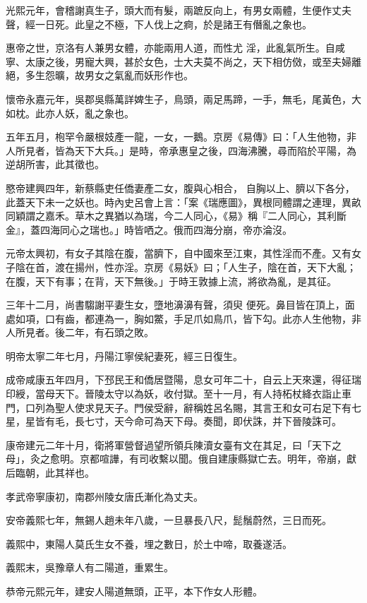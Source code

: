\begin{pinyinscope}
 光熙元年，會稽謝真生子，頭大而有髮，兩蹠反向上，有男女兩體，生便作丈夫聲，經一日死。此皇之不極，下人伐上之痾，於是諸王有僭亂之象也。



 惠帝之世，京洛有人兼男女體，亦能兩用人道，而性尤
 淫，此亂氣所生。自咸寧、太康之後，男寵大興，甚於女色，士大夫莫不尚之，天下相仿傚，或至夫婦離絕，多生怨曠，故男女之氣亂而妖形作也。



 懷帝永嘉元年，吳郡吳縣萬詳婢生子，鳥頭，兩足馬蹄，一手，無毛，尾黃色，大如枕。此亦人妖，亂之象也。



 五年五月，枹罕令嚴根妓產一龍，一女，一鵝。京房《易傳》曰：「人生他物，非人所見者，皆為天下大兵。」是時，帝承惠皇之後，四海沸騰，尋而陷於平陽，為逆胡所害，此其徵也。



 愍帝建興四年，新蔡縣吏任僑妻產二女，腹與心相合，
 自胸以上、臍以下各分，此蓋天下未一之妖也。時內史呂會上言：「案《瑞應圖》，異根同體謂之連理，異畝同穎謂之嘉禾。草木之異猶以為瑞，今二人同心，《易》稱『二人同心，其利斷金』，蓋四海同心之瑞也。」時皆哂之。俄而四海分崩，帝亦淪沒。



 元帝太興初，有女子其陰在腹，當臍下，自中國來至江東，其性淫而不產。又有女子陰在首，渡在揚州，性亦淫。京房《易妖》曰；「人生子，陰在首，天下大亂；在腹，天下有事；在背，天下無後。」于時王敦據上流，將欲為亂，是其征。



 三年十二月，尚書騶謝平妻生女，墮地濞濞有聲，須臾
 便死。鼻目皆在頂上，面處如項，口有齒，都連為一，胸如鱉，手足爪如鳥爪，皆下勾。此亦人生他物，非人所見者。後二年，有石頭之敗。



 明帝太寧二年七月，丹陽江寧侯紀妻死，經三日復生。



 成帝咸康五年四月，下邳民王和僑居暨陽，息女可年二十，自云上天來還，得征瑞印綬，當母天下。晉陵太守以為妖，收付獄。至十一月，有人持柘杖絳衣詣止車門，口列為聖人使求見天子。門侯受辭，辭稱姓呂名賜，其言王和女可右足下有七星，星皆有毛，長七寸，天今命可為天下母。奏聞，即伏誅，并下晉陵誅可。



 康帝建元二年十月，衛將軍營督過望所領兵陳瀆女臺有文在其足，曰「天下之母」，灸之愈明。京都喧譁，有司收繫以聞。俄自建康縣獄亡去。明年，帝崩，獻后臨朝，此其祥也。



 孝武帝寧康初，南郡州陵女唐氏漸化為丈夫。



 安帝義熙七年，無錫人趙未年八歲，一旦暴長八尺，髭鬚蔚然，三日而死。



 義熙中，東陽人莫氏生女不養，埋之數日，於土中啼，取養遂活。



 義熙末，吳豫章人有二陽道，重累生。



 恭帝元熙元年，建安人陽道無頭，正平，本下作女人形體。



\end{pinyinscope}